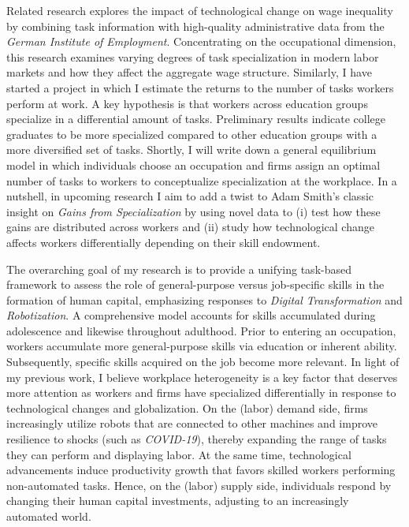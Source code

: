 \documentclass[a4paper,11pt]{article}
\begin{document}
Related research explores the impact of technological change on wage inequality by combining task information with high-quality administrative data from the \textit{German Institute of Employment}. Concentrating on the occupational dimension, this research examines varying degrees of task specialization in modern labor markets and how they affect the aggregate wage structure. Similarly, I have started a project in which I estimate the returns to the number of tasks workers perform at work. A key hypothesis is that workers across education groups specialize in a differential amount of tasks. Preliminary results indicate college graduates to be more specialized compared to other education groups with a more diversified set of tasks. Shortly, I will write down a general equilibrium model in which individuals choose an occupation and firms assign an optimal number of tasks to workers to conceptualize specialization at the workplace. In a nutshell, in upcoming research I aim to add a twist to Adam Smith's classic insight on \textit{Gains from Specialization} by using novel data to (i) test how these gains are distributed across workers and (ii) study how technological change affects workers differentially depending on their skill endowment. 

The overarching goal of my research is to provide a unifying task-based framework to assess the role of general-purpose versus job-specific skills in the formation of human capital, emphasizing responses to \textit{Digital Transformation} and \textit{Robotization}. A comprehensive model accounts for skills accumulated during adolescence and likewise throughout adulthood. Prior to entering an occupation, workers accumulate more general-purpose skills via education or inherent ability. Subsequently, specific skills acquired on the job become more relevant. In light of my previous work, I believe workplace heterogeneity is a key factor that deserves more attention as workers and firms have specialized differentially in response to technological changes and globalization. On the (labor) demand side, firms increasingly utilize robots that are connected to other machines and improve resilience to shocks (such as \textit{COVID-19}), thereby expanding the range of tasks they can perform and displaying labor. At the same time, technological advancements induce productivity growth that favors skilled workers performing non-automated tasks. Hence, on the (labor) supply side, individuals respond by changing their human capital investments, adjusting to an increasingly automated world. 
\end{document}
